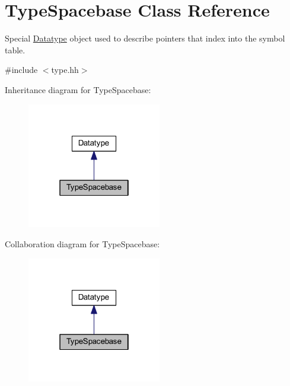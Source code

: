 \hypertarget{class_type_spacebase}{}\section{Type\+Spacebase Class Reference}
\label{class_type_spacebase}


Special \mbox{\hyperlink{class_datatype}{Datatype}} object used to describe pointers that index into the symbol table.  




{\ttfamily \#include $<$type.\+hh$>$}



Inheritance diagram for Type\+Spacebase\+:
\nopagebreak
\begin{figure}[H]
\begin{center}
\leavevmode
\includegraphics[width=166pt]{class_type_spacebase__inherit__graph}
\end{center}
\end{figure}


Collaboration diagram for Type\+Spacebase\+:
\nopagebreak
\begin{figure}[H]
\begin{center}
\leavevmode
\includegraphics[width=166pt]{class_type_spacebase__coll__graph}
\end{center}
\end{figure}
